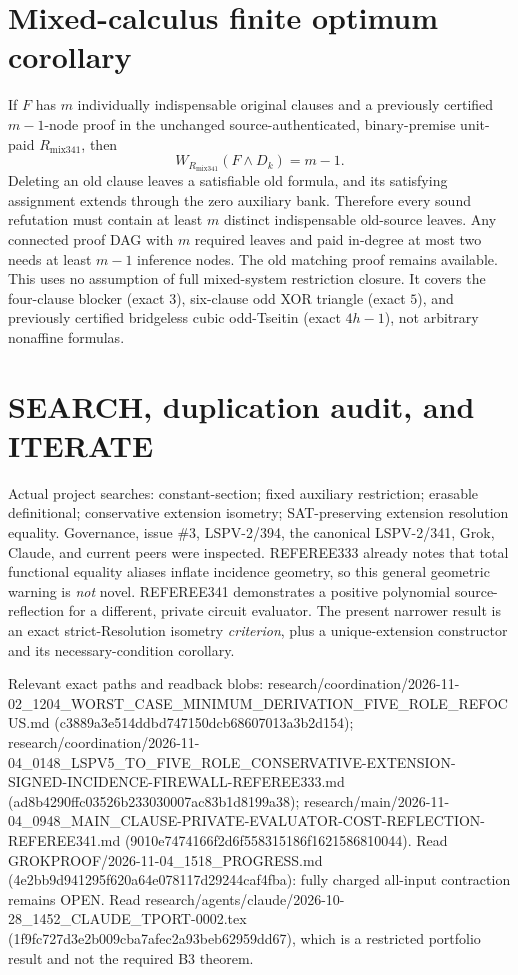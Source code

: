 \documentclass{article}
\begin{document}
\section*{Mixed-calculus finite optimum corollary}
If $F$ has $m$ individually indispensable original clauses and a previously certified $m-1$-node proof in the unchanged source-authenticated, binary-premise unit-paid $R_{\mathrm{mix341}}$, then
\[
W_{R_{\mathrm{mix341}}}(F\wedge D_k)=m-1.
\]
Deleting an old clause leaves a satisfiable old formula, and its satisfying assignment extends through the zero auxiliary bank. Therefore every sound refutation must contain at least $m$ distinct indispensable old-source leaves. Any connected proof DAG with $m$ required leaves and paid in-degree at most two needs at least $m-1$ inference nodes. The old matching proof remains available. This uses no assumption of full mixed-system restriction closure. It covers the four-clause blocker (exact $3$), six-clause odd XOR triangle (exact $5$), and previously certified bridgeless cubic odd-Tseitin (exact $4h-1$), not arbitrary nonaffine formulas.

\section*{SEARCH, duplication audit, and ITERATE}
Actual project searches: constant-section; fixed auxiliary restriction; erasable definitional; conservative extension isometry; SAT-preserving extension resolution equality. Governance, issue \#3, LSPV-2/394, the canonical LSPV-2/341, Grok, Claude, and current peers were inspected. REFEREE333 already notes that total functional equality aliases inflate incidence geometry, so this general geometric warning is \emph{not} novel. REFEREE341 demonstrates a positive polynomial source-reflection for a different, private circuit evaluator. The present narrower result is an exact strict-Resolution isometry \emph{criterion}, plus a unique-extension constructor and its necessary-condition corollary.

Relevant exact paths and readback blobs: research/coordination/2026-11-02\_1204\_WORST\_CASE\_MINIMUM\_DERIVATION\_FIVE\_ROLE\_REFOCUS.md (c3889a3e514ddbd747150dcb68607013a3b2d154); research/coordination/2026-11-04\_0148\_LSPV5\_TO\_FIVE\_ROLE\_CONSERVATIVE-EXTENSION-SIGNED-INCIDENCE-FIREWALL-REFEREE333.md (ad8b4290ffc03526b233030007ac83b1d8199a38); research/main/2026-11-04\_0948\_MAIN\_CLAUSE-PRIVATE-EVALUATOR-COST-REFLECTION-REFEREE341.md (9010e7474166f2d6f558315186f1621586810044). Read GROKPROOF/2026-11-04\_1518\_PROGRESS.md (4e2bb9d941295f620a64e078117d29244caf4fba): fully charged all-input contraction remains OPEN. Read research/agents/claude/2026-10-28\_1452\_CLAUDE\_TPORT-0002.tex (1f9fc727d3e2b009cba7afec2a93beb62959dd67), which is a restricted portfolio result and not the required B3 theorem.
\end{document}
